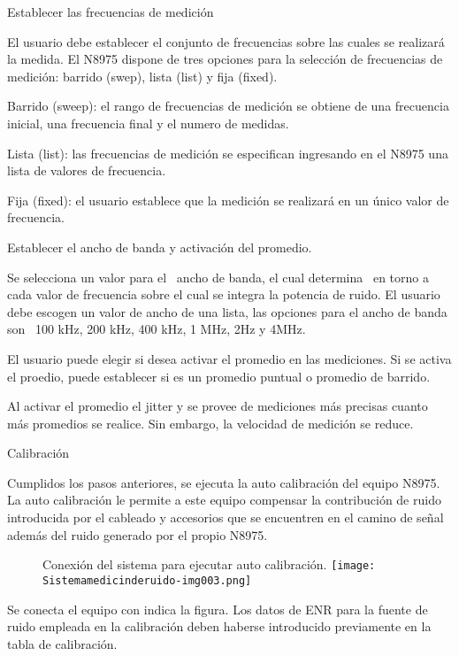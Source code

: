 \documentclass[paper=letter,oneside,fontsize=10pt,parskip=full]{article}
\begin{document}
Establecer las frecuencias de medición

El usuario debe establecer el conjunto de frecuencias sobre las cuales se realizará la medida. El N8975 dispone de tres
opciones para la selección de frecuencias de medición: barrido (swep), lista (list) y fija (fixed).

Barrido (sweep): el rango de frecuencias de medición se obtiene de una frecuencia inicial, una frecuencia final y el
numero de medidas.

Lista (list): las frecuencias de medición se especifican ingresando en el N8975 una lista de valores de frecuencia.

Fija (fixed): el usuario establece que la medición se realizará en un único valor de frecuencia.

Establecer el ancho de banda y activación del promedio.

Se selecciona un valor para el \ ancho de banda, el cual determina \ en torno a cada valor de frecuencia sobre el cual
se integra la potencia de ruido. El usuario debe escogen un valor de ancho de una lista, las opciones para el ancho de
banda son \ 100 kHz, 200 kHz, 400 kHz, 1 MHz, 2Hz y 4MHz.

El usuario puede elegir si desea activar el promedio en las mediciones. Si se activa el proedio, puede establecer si es
un promedio puntual o promedio de barrido.

Al activar el promedio el jitter y se provee de mediciones más precisas cuanto más promedios se realice. Sin embargo, la
velocidad de medición se reduce.

Calibración

Cumplidos los pasos anteriores, se ejecuta la auto calibración del equipo N8975. La auto calibración le permite a este
equipo compensar la contribución de ruido introducida por el cableado y accesorios que se encuentren en el camino de
señal además del ruido generado por el propio N8975.



\begin{figure}
\centering
\begin{minipage}{8.063cm}
Conexión del sistema para ejecutar auto calibración.
\texttt{[image: Sistemamedicinderuido-img003.png]}\end{minipage}
\end{figure}
Se conecta el equipo con indica la figura. Los datos de ENR para la fuente de ruido empleada en la calibración deben
haberse introducido previamente en la tabla de calibración.
\end{document}
